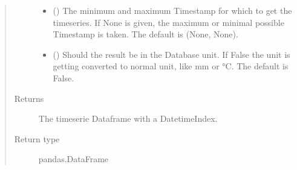 \documentclass[letterpaper,10pt,english]{sphinxmanual}
\begin{document}
\begin{fulllineitems}
\begin{fulllineitems}
\begin{quote}
\begin{description}
\begin{itemize}
\item {} 
\sphinxAtStartPar
{} ({\hyperref[\detokenize{weatherDB.lib:weatherDB.lib.utils.TimestampPeriod}]{}}\sphinxstyleliteralemphasis{\sphinxupquote{(}}\sphinxstyleliteralemphasis{\sphinxupquote{)}}\sphinxstyleliteralemphasis{\sphinxupquote{, }}) \textendash{} The minimum and maximum Timestamp for which to get the timeseries.
If None is given, the maximum or minimal possible Timestamp is taken.
The default is (None, None).

\item {} 
\sphinxAtStartPar
{} (\sphinxstyleliteralemphasis{\sphinxupquote{, }}) \textendash{} Should the result be in the Database unit.
If False the unit is getting converted to normal unit, like mm or °C.
The default is False.

\end{itemize}

\item[{Returns}] \leavevmode
\sphinxAtStartPar
The timeserie Dataframe with a DatetimeIndex.

\item[{Return type}] \leavevmode
\sphinxAtStartPar
pandas.DataFrame

\end{description}\end{quote}

\end{fulllineitems}



\end{fulllineitems}
\end{document}
